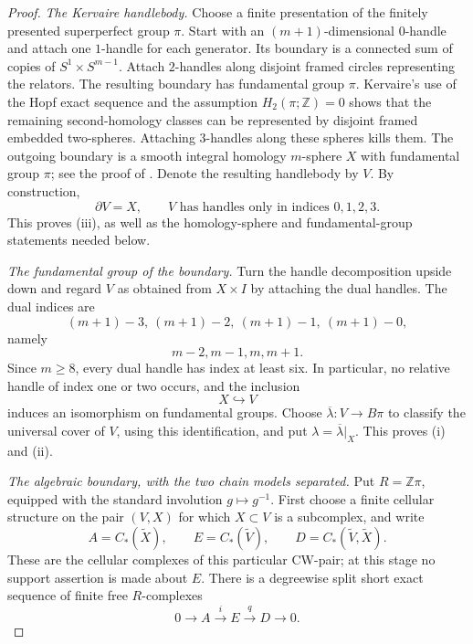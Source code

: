 \documentclass[10pt,reqno]{amsart}
\numberwithin{equation}{section}
\theoremstyle{definition}
\theoremstyle{remark}
\newcommand{\Z}{\mathbb Z}
\begin{document}
\begin{proof}
\emph{The Kervaire handlebody.}
Choose a finite presentation of the finitely presented superperfect
group \(\pi\).  Start with an \((m+1)\)-dimensional \(0\)-handle and
attach one \(1\)-handle for each generator.  Its boundary is a
connected sum of copies of \(S^1\times S^{m-1}\).  Attach
\(2\)-handles along disjoint framed circles representing the
relators.  The resulting boundary has fundamental group \(\pi\).
Kervaire's use of the Hopf exact sequence and the assumption
\(H_2(\pi;\Z)=0\) shows that the remaining second-homology classes can
be represented by disjoint framed embedded two-spheres.  Attaching
\(3\)-handles along these spheres kills them.  The outgoing boundary
is a smooth integral homology \(m\)-sphere \(X\) with fundamental
group \(\pi\); see the proof of
\cite[Theorem~1]{KervaireHomologySpheres}.  Denote the resulting
handlebody by \(V\).  By construction,
\[
\partial V=X,
\qquad
V\text{ has handles only in indices }0,1,2,3.
\]
This proves (iii), as well as the homology-sphere and fundamental-group
statements needed below.

\smallskip
\noindent
\emph{The fundamental group of the boundary.}
Turn the handle decomposition upside down and regard \(V\) as obtained
from \(X\times I\) by attaching the dual handles.  The dual indices are
\[
(m+1)-3,\ (m+1)-2,\ (m+1)-1,\ (m+1)-0,
\]
namely
\[
m-2,m-1,m,m+1.
\]
Since \(m\geq8\), every dual handle has index at least six.  In
particular, no relative handle of index one or two occurs, and the
inclusion
\[
X\hookrightarrow V
\]
induces an isomorphism on fundamental groups.  Choose
\(\overline\lambda:V\to B\pi\) to classify the universal cover of
\(V\), using this identification, and put
\(\lambda=\overline\lambda|_X\).  This proves (i) and (ii).

\smallskip
\noindent
\emph{The algebraic boundary, with the two chain models separated.}
Put \(R=\Z\pi\), equipped with the standard involution
\(g\mapsto g^{-1}\).  First choose a finite cellular structure on the
pair \((V,X)\) for which \(X\subset V\) is a subcomplex, and write
\[
A=C_*(\widetilde X),
\qquad
E=C_*(\widetilde V),
\qquad
D=C_*(\widetilde V,\widetilde X).
\]
These are the cellular complexes of this particular CW-pair; at this
stage no support assertion is made about \(E\).  There is a degreewise
split short exact sequence of finite free \(R\)-complexes
\begin{equation}\label{eq:antisimple-short-exact}
0\longrightarrow A
\xrightarrow{\,i\,}E
\xrightarrow{\,q\,}D
\longrightarrow0.
\end{equation}


\end{proof}
\end{document}
